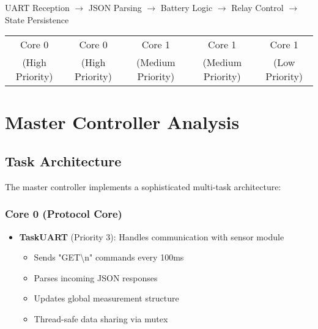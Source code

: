 \documentclass[11pt,a4paper]{article}
\begin{document}
\begin{tcolorbox}[colback=green!5!white,colframe=green!75!black,title=Master Controller Flow]
UART Reception $\rightarrow$ JSON Parsing $\rightarrow$ Battery Logic $\rightarrow$ Relay Control $\rightarrow$ State Persistence

\begin{tabular}{ccccc}
Core 0 & Core 0 & Core 1 & Core 1 & Core 1 \\
(High Priority) & (High Priority) & (Medium Priority) & (Medium Priority) & (Low Priority)
\end{tabular}
\end{tcolorbox}

\section{Master Controller Analysis}

\subsection{Task Architecture}

The master controller implements a sophisticated multi-task architecture:

\subsubsection{Core 0 (Protocol Core)}
\begin{itemize}
    \item \textbf{TaskUART} (Priority 3): Handles communication with sensor module
    \begin{itemize}
        \item Sends "GET\textbackslash n" commands every 100ms
        \item Parses incoming JSON responses
        \item Updates global measurement structure
        \item Thread-safe data sharing via mutex
    \end{itemize}
\end{itemize}
\end{document}
